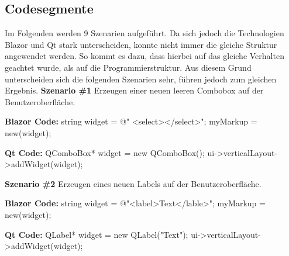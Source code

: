 \subsection{Codesegmente}
\label{subsec:CodeSegemente}
Im Folgenden werden 9 Szenarien aufgeführt. Da sich jedoch die Technologien Blazor und Qt stark
unterscheiden, konnte nicht immer die gleiche Struktur angewendet werden. So kommt es dazu,
dass hierbei auf das gleiche Verhalten geachtet wurde, als auf die Programmierstruktur. Aus
diesem Grund unterscheiden sich die folgenden Szenarien sehr, führen jedoch zum gleichen Ergebnis.
\newline
\newline
\textbf{Szenario \#1}
\newline
Erzeugen einer neuen leeren Combobox auf der Benutzeroberfläche.

\begin{zitat}
    \textbf{Blazor Code:}
    \newline
    string widget = @" <select></select>";
    \newline
    myMarkup = new(widget);
\end{zitat}

\begin{zitat}
    \textbf{Qt Code:}
    \newline
    QComboBox* widget = new QComboBox();
    \newline
    ui->verticalLayout->addWidget(widget);
\end{zitat}
\newline
\newline

\textbf{Szenario \#2}
\newline
Erzeugen eines neuen Labels auf der Benutzeroberfläche.

\begin{zitat}
    \textbf{Blazor Code:}
    \newline
    string widget = @"<label>Text</lable>";
    \newline
    myMarkup = new(widget);
\end{zitat}

\begin{zitat}
    \textbf{Qt Code:}
    \newline
    QLabel* widget = new QLabel("Text");
    \newline
    ui->verticalLayout->addWidget(widget);
\end{zitat}
\newline
\newline


